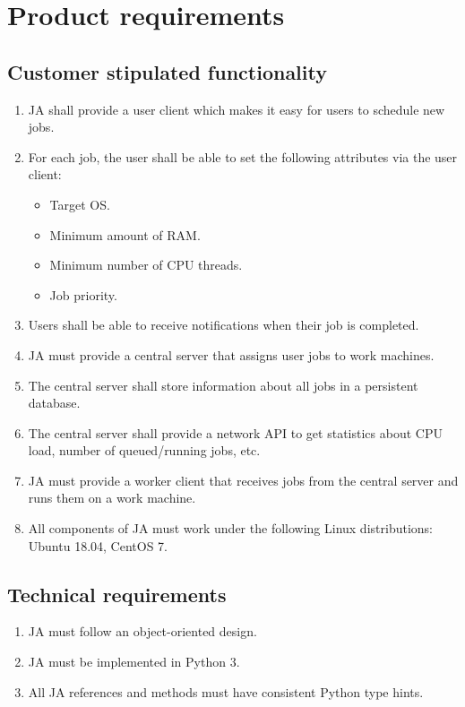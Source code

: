 \chapter{Product requirements}
\section{Customer stipulated functionality}
\begin{enumerate}
  \item JA shall provide a user client which makes it easy for users to schedule new jobs.
  \item For each job, the user shall be able to set the following attributes via the user client:
    \begin{itemize}
      \item Target OS.
      \item Minimum amount of RAM.
      \item Minimum number of CPU threads.
      \item Job priority.
    \end{itemize}
  \item Users shall be able to receive notifications when their job is completed.
  \item JA must provide a central server that assigns user jobs to work machines.
  \item The central server shall store information about all jobs in a persistent database.
  \item The central server shall provide a network API to get statistics about CPU load, number of queued/running jobs, etc.
  \item JA must provide a worker client that receives jobs from the central server and runs them on a work machine.
  \item All components of JA must work under the following Linux distributions: Ubuntu 18.04, CentOS 7.
\end{enumerate}
\section{Technical requirements}
\begin{enumerate}
  \item JA must follow an object-oriented design.
  \item JA must be implemented in Python 3.
  \item All JA references and methods must have consistent Python type hints.
\end{enumerate}
